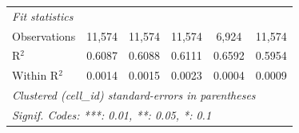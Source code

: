 \begin{table}[htbp]
\begin{tabular}{lccccc}
      \midrule
      \emph{Fit statistics}\\
      Observations                     & 11,574        & 11,574   & 11,574   & 6,924    & 11,574\\  
      R$^2$                            & 0.6087        & 0.6088   & 0.6111   & 0.6592   & 0.5954\\  
      Within R$^2$                     & 0.0014        & 0.0015   & 0.0023   & 0.0004   & 0.0009\\  
      \midrule \midrule
      \multicolumn{6}{l}{\emph{Clustered (cell\_id) standard-errors in parentheses}}\\
      \multicolumn{6}{l}{\emph{Signif. Codes: ***: 0.01, **: 0.05, *: 0.1}}\\
   \end{tabular}
\end{table}


